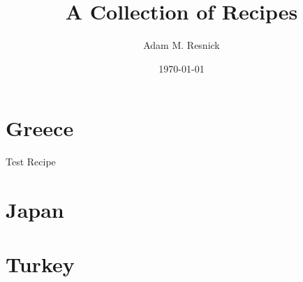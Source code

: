 \documentclass[11pt]{report}
\title{\bf{A Collection of Recipes}}
\author{Adam M. Resnick}
\date{\today}
\begin{document}
\maketitle

\tableofcontents

\chapter{Greece}

\begin{recipe}
  {Test Recipe}
\end{recipe}

\chapter{Japan}

\chapter{Turkey}
\end{document}
